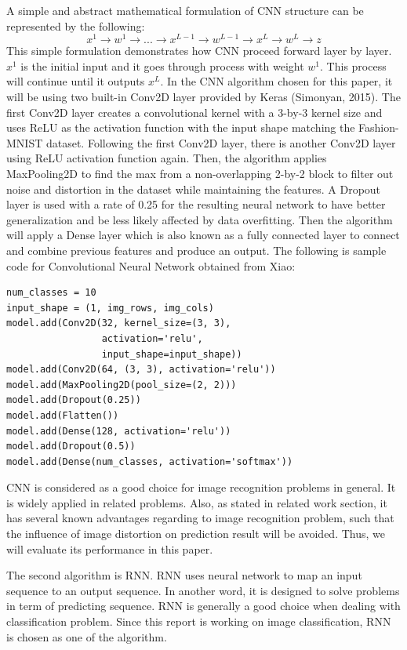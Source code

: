 \documentclass[letterpaper]{article} %
\begin{document}
A simple and abstract mathematical formulation of CNN structure can be represented by the following:
$$x^1\rightarrow w^1 \rightarrow ... \rightarrow x^{L-1} \rightarrow w^{L-1} \rightarrow x^L \rightarrow w^L \rightarrow z$$
This simple formulation demonstrates how CNN proceed forward layer by layer. $x^1$ is the initial input and it goes through process with weight $w^1$. This process will continue until it outputs $x^{L}$. In the CNN algorithm chosen for this paper, it will be using two built-in Conv2D layer provided by Keras (Simonyan, 2015). The first Conv2D layer creates a convolutional kernel with a 3-by-3 kernel size and uses ReLU as the activation function with the input shape matching the Fashion-MNIST dataset. Following the first Conv2D layer, there is another Conv2D layer using ReLU activation function again. Then, the algorithm applies MaxPooling2D to find the max from a non-overlapping 2-by-2 block to filter out noise and distortion in the dataset while maintaining the features. A Dropout layer is used with a rate of 0.25 for the resulting neural network to have better generalization and be less likely affected by data overfitting. Then the algorithm will apply a Dense layer which is also known as a fully connected layer to connect and combine previous features and produce an output. The following is sample code for Convolutional Neural Network obtained from Xiao:
\begin{lstlisting}[columns=fullflexible, keepspaces=true, stepnumber=1]
num_classes = 10
input_shape = (1, img_rows, img_cols)
model.add(Conv2D(32, kernel_size=(3, 3),
                 activation='relu',
                 input_shape=input_shape))
model.add(Conv2D(64, (3, 3), activation='relu'))
model.add(MaxPooling2D(pool_size=(2, 2)))
model.add(Dropout(0.25))
model.add(Flatten())
model.add(Dense(128, activation='relu'))
model.add(Dropout(0.5))
model.add(Dense(num_classes, activation='softmax'))
\end{lstlisting}

CNN is considered as a good choice for image recognition problems in general. It is widely applied in related problems. Also, as stated in related work section, it has several known advantages regarding to image recognition problem, such that the influence of image distortion on prediction result will be avoided. Thus, we will evaluate its performance in this paper.

The second algorithm is RNN. RNN uses neural network to map an input sequence to an output sequence. In another word, it is designed to solve problems in term of predicting sequence. RNN is generally a good choice when dealing with classification problem. Since this report is working on image classification, RNN is chosen as one of the algorithm.
\end{document}

